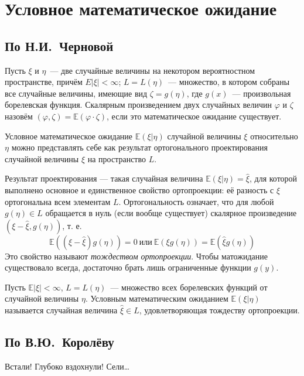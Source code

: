 \section{Условное математическое ожидание}

\subsection{По Н.И.~Черновой}
Пусть $\xi$ и $\eta$~--- две случайные величины на некотором вероятностном пространстве, причём $E|\xi|<\infty$; $L=L(\eta)$~--- множество, в котором собраны все случайные величины, имеющие вид $\zeta=g(\eta)$, где $g(x)$~--- произвольная борелевская функция. Скалярным произведением двух случайных величин $\varphi$ и $\zeta$ назовём $(\varphi, \zeta)=\mathbb{E}(\varphi \cdot \zeta)$, если это математическое ожидание существует.

Условное математическое ожидание $\mathbb{E}(\xi | \eta)$ случайной величины $\xi$ относительно $\eta$ можно представлять себе как результат ортогонального проектирования случайной величины $\xi$ на пространство $L$.

Результат проектирования — такая случайная величина $\mathbb{E}(\xi | \eta)=\widehat{\xi}$, для которой выполнено основное и единственное свойство ортопроекции: её разность с $\xi$ ортогональна всем элементам $L$. Ортогональность означает, что для любой $g(\eta) \in L$ обращается в нуль (если вообще существует) скалярное произведение $(\xi-\widehat{\xi}, g(\eta))$, т. е.
\begin{equation*}
    \mathbb{E}((\xi-\widehat{\xi}) g(\eta))=0~ \text{или}~ \mathbb{E}(\xi g(\eta))=\mathbb{E}(\widehat{\xi} g(\eta))
\end{equation*}
Это свойство называют \textit{тождеством ортопроекции}. Чтобы матожидание существовало всегда, достаточно брать лишь ограниченные функции $g(y)$.

\begin{defn}
    Пусть $\mathbb{E}|\xi|<\infty$, $L=L(\eta)$~--- множество всех борелевских функций от случайной величины $\eta$. 
    Условным математическим ожиданием $\mathbb{E}(\xi | \eta)$ называется случайная величина $\widehat{\xi} \in L$, удовлетворяющая тождеству ортопроекции.
\end{defn}

\subsection{По В.Ю.~Королёву}
    Встали! Глубоко вздохнули! Сели\ldots
    
